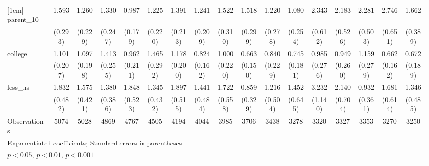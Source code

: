 {\begin{tabular}{l*{16}{c}}
[1em]
parent\_10           &       1.593\sym{*}  &       1.260         &       1.330         &       0.987         &       1.225         &       1.391\sym{*}  &       1.241         &       1.522\sym{*}  &       1.518\sym{*}  &       1.220         &       1.080         &       2.343\sym{**} &       2.183\sym{**} &       2.281\sym{***}&       2.746\sym{***}&       1.662\sym{*}  \\
                    &     (0.293)         &     (0.229)         &     (0.247)         &     (0.179)         &     (0.220)         &     (0.213)         &     (0.209)         &     (0.310)         &     (0.299)         &     (0.278)         &     (0.254)         &     (0.612)         &     (0.526)         &     (0.503)         &     (0.651)         &     (0.389)         \\
[1em]
college             &       1.101         &       1.097         &       1.413         &       0.962         &       1.465         &       1.178         &       0.824         &       1.000         &       0.663         &       0.840         &       0.745         &       0.985         &       0.949         &       1.159         &       0.662         &       0.672         \\
                    &     (0.207)         &     (0.198)         &     (0.255)         &     (0.211)         &     (0.292)         &     (0.200)         &     (0.162)         &     (0.220)         &     (0.150)         &     (0.229)         &     (0.181)         &     (0.276)         &     (0.260)         &     (0.279)         &     (0.162)         &     (0.189)         \\
[1em]
less\_hs             &       1.832\sym{*}  &       1.575         &       1.380         &       1.848\sym{*}  &       1.345         &       1.897\sym{*}  &       1.441         &       1.722         &       0.859         &       1.216         &       1.452         &       3.232\sym{***}&       2.140\sym{*}  &       0.932         &       1.681         &       1.346         \\
                    &     (0.482)         &     (0.421)         &     (0.386)         &     (0.523)         &     (0.432)         &     (0.515)         &     (0.484)         &     (0.558)         &     (0.329)         &     (0.504)         &     (0.645)         &     (1.140)         &     (0.704)         &     (0.361)         &     (0.614)         &     (0.485)         \\
\hline
Observations        &        5074         &        5028         &        4869         &        4767         &        4505         &        4194         &        4044         &        3985         &        3706         &        3438         &        3278         &        3320         &        3327         &        3353         &        3270         &        3250         \\
\hline\hline
\multicolumn{17}{l}{\footnotesize Exponentiated coefficients; Standard errors in parentheses}\\
\multicolumn{17}{l}{\footnotesize \sym{*} \(p<0.05\), \sym{**} \(p<0.01\), \sym{***} \(p<0.001\)}\\
\end{tabular}
}
